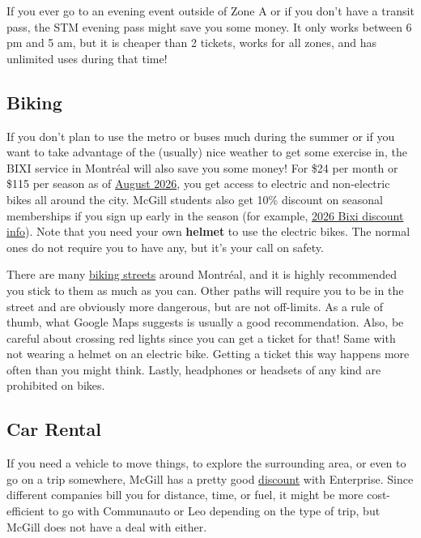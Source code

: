  If you ever go to an evening event outside of Zone A or if you don't have a transit pass, the STM evening pass might save you some money. It only works between 6 pm and 5 am, but it is cheaper than 2 tickets, works for all zones, and has unlimited uses during that time!

\subsection{Biking} 
If you don't plan to use the metro or buses much during the summer or if you want to take advantage of the (usually) nice weather to get some exercise in, the BIXI service in Montréal will also save you some money! For \$24 per month or \$115 per season as of \href{https://bixi.com/en/pricing/}{August 2026}, you get access to electric and non-electric bikes all around the city. McGill students also get 10\% discount on seasonal memberships if you sign up early in the season (for example, \href{https://www.mcgill.ca/transport/cycling/10-discount-2026-bixi-seasonal-memberships}{2026 Bixi discount info}). Note that you need your own \textbf{helmet} to use the electric bikes. The normal ones do not require you to have any, but it's your call on safety. 

There are many \href{https://services.montreal.ca/en/maps/bike-paths}{biking streets} around Montréal, and it is highly recommended you stick to them as much as you can. Other paths will require you to be in the street and are obviously more dangerous, but are not off-limits. As a rule of thumb, what Google Maps suggests is usually a good recommendation. Also, be careful about crossing red lights since you can get a ticket for that! Same with not wearing a helmet on an electric bike. Getting a ticket this way happens more often than you might think. Lastly, headphones or headsets of any kind are prohibited on bikes.

\subsection{Car Rental}
If you need a vehicle to move things, to explore the surrounding area, or even to go on a trip somewhere, McGill has a pretty good \href{https://www.mcgill.ca/travelservices/transport/book-vehicle/enterprise}{discount} with Enterprise. Since different companies bill you for distance, time, or fuel, it might be more cost-efficient to go with Communauto or Leo depending on the type of trip, but McGill does not have a deal with either.


